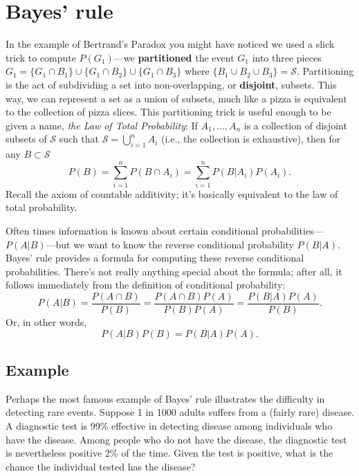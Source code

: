 \documentclass[
]{book}
\begin{document}
\hypertarget{bayes-rule}{%
\section{Bayes' rule}\label{bayes-rule}}

In the example of Bertrand's Paradox you might have noticed we used a slick trick to compute \(P(G_1)\)---we \textbf{partitioned} the event \(G_1\) into three pieces \(G_1 = \{G_1 \cap B_1\}\cup \{G_1 \cap B_2\}\cup \{G_1 \cap B_3\}\) where \(\{B_1 \cup B_2 \cup B_3\} = \mathcal{S}\). Partitioning is the act of subdividing a set into non-overlapping, or \textbf{disjoint}, subsets. This way, we can represent a set as a union of subsets, much like a pizza is equivalent to the collection of pizza slices. This partitioning trick is useful enough to be given a name, \emph{the Law of Total Probability}: If \(A_1, \ldots, A_n\) is a collection of disjoint subsets of \(\mathcal{S}\) such that \(\mathcal{S} = \bigcup_{i=1}^n A_i\) (i.e., the collection is exhaustive), then for any \(B\subset \mathcal{S}\)
\[P(B) = \sum_{i=1}^n P(B \cap A_i) = \sum_{i=1}^n P(B | A_i)P(A_i).\]
Recall the axiom of countable additivity; it's basically equivalent to the law of total probability.

Often times information is known about certain conditional probabilities---\(P(A|B)\)---but we want to know the reverse conditional probability \(P(B|A)\). Bayes' rule provides a formula for computing these reverse conditional probabilities. There's not really anything special about the formula; after all, it follows immediately from the definition of conditional probability:
\[P(A|B) = \frac{P(A\cap B)}{P(B)} = \frac{P(A\cap B)P(A)}{P(B)P(A)} = \frac{P(B|A)P(A)}{P(B)}.\]
Or, in other words,
\[P(A|B)P(B) = P(B|A)P(A).\]

\hypertarget{example-3}{%
\subsection{Example}\label{example-3}}

Perhaps the most famous example of Bayes' rule illustrates the difficulty in detecting rare events. Suppose 1 in 1000 adults suffers from a (fairly rare) disease. A diagnostic test is 99\% effective in detecting disease among individuals who have the disease. Among people who do not have the disease, the diagnostic test is nevertheless positive 2\% of the time. Given the test is positive, what is the chance the individual tested has the disease?
\end{document}
